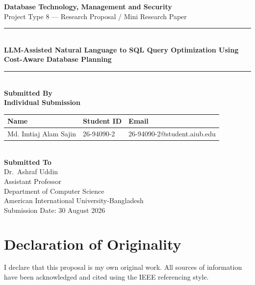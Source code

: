 \documentclass[12pt, a4paper]{article}
\newcommand{\CourseName}{Database Technology, Management and Security}
\newcommand{\ReportTitle}{LLM-Assisted Natural Language to SQL Query
Optimization Using Cost-Aware Database Planning}
\newcommand{\ProjectType}{Project Type 8 --- Research Proposal / Mini Research Paper}
\newcommand{\GroupNumber}{Individual Submission}
\newcommand{\SubmissionDate}{30 August 2026}
\newcommand{\InstructorName}{Dr.\ Ashraf Uddin}
\newcommand{\InstructorTitle}{Assistant Professor}
\newcommand{\InstructorDept}{Department of Computer Science}
\newcommand{\InstructorInstitution}{American International University-Bangladesh}
\begin{document}
\begin{titlepage}
    \centering
    \vspace*{1.2cm}

    {\large \textbf{\CourseName}}\\[0.4cm]
    {\large \ProjectType}\\[1.6cm]

    \rule{\linewidth}{0.5mm}\\[0.6cm]
    {\LARGE \textbf{\ReportTitle}}\\[0.4cm]
    \rule{\linewidth}{0.5mm}\\[1.4cm]

    {\large \textbf{Submitted By}}\\[0.4cm]
    {\large \textbf{\GroupNumber}}\\[0.5cm]

    \begin{tabular}{@{}lll@{}}
        \toprule
        \textbf{Name} & \textbf{Student ID} & \textbf{Email} \\
        \midrule
        Md. Imtiaj Alam Sajin & 26-94090-2 & \small 26-94090-2@student.aiub.edu \\
        \bottomrule
    \end{tabular}\\[1.4cm]

    {\large \textbf{Submitted To}}\\[0.4cm]
    {\large \InstructorName}\\[0.15cm]
    \InstructorTitle\\[0.15cm]
    \InstructorDept\\[0.15cm]
    \InstructorInstitution\\[0.9cm]

    \vfill
    {\large Submission Date: \SubmissionDate}\\[0.4cm]
\end{titlepage}

\section*{Declaration of Originality}
I declare that this proposal is my own original work. All sources of
information have been acknowledged and cited using the IEEE referencing
style.
\end{document}
